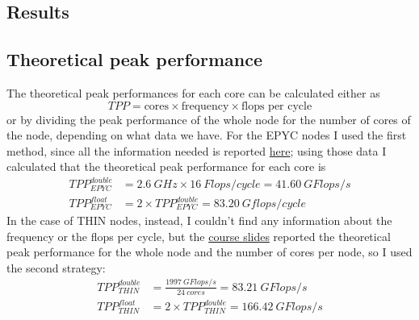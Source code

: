 \documentclass[12pt]{article}
\begin{document}
    \subsection{Results}
        \subsection{Theoretical peak performance}
        The theoretical peak performances for each core can be calculated either as
        \begin{equation}
            TPP = \text{cores} \times \text{frequency} \times \text{flops per cycle}
        \end{equation}
        or by dividing the peak performance of the whole node for the number of cores of the node, depending on what data we have.\newline
        For the EPYC nodes I used the first method, since all the information needed is reported \href{https://github.com/Foundations-of-HPC/Foundations_of_HPC_2022/blob/main/Basic/Benchmarking/running-HPL/hpl-on-epyc.md}{here};
        using those data I calculated that the theoretical peak performance for each core is
        \begin{equation}
        \begin{aligned}
            TPP_{EPYC}^{double} &= \SI{2.6}{GHz} \times \SI{16}{Flops/cycle} = \SI{41.60}{GFlops/s}\\
            TPP_{EPYC}^{float} &= 2 \times TPP_{EPYC}^{double} = \SI{83.20}{Gflops/cycle}
        \end{aligned}
        \end{equation}
        In the case of THIN nodes, instead, I couldn't find any information about the frequency or the flops per cycle, but the  \href{https://raw.githubusercontent.com/Foundations-of-HPC/Foundations_of_HPC_2022/main/Basic/Intro/lecture02-HPC-hardware.pdf}{course slides} reported the theoretical peak performance for the whole node and the number of cores per node, so I used the second strategy:
        \begin{equation}
        \begin{aligned}
            TPP_{THIN}^{double} &= \frac{\SI{1997}{GFlops/s}}{\SI{24}{cores}} = \SI{83.21}{GFlops/s}\\
            TPP_{THIN}^{float} &= 2 \times TPP_{THIN}^{double} = \SI{166.42}{GFlops/s}
        \end{aligned}
        \label{eq:TPP}
        \end{equation}
        
\end{document}
